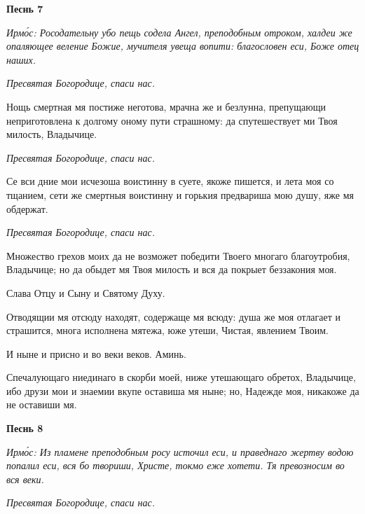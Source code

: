  

\bfseries Песнь 7\normalfont{}


 \itshape Ирмо́с:\normalfont{} Росодательну убо пещь содела Ангел, преподобным отроком, халдеи же
опаляющее веление Божие, мучителя увеща вопити: благословен еси, Боже отец
наших.



 \itshape  Пресвятая Богородице, спаси нас.
\normalfont{}


   Нощь смертная мя постиже неготова, мрачна же и безлунна, препущающи
неприготовлена к долгому оному пути страшному: да спутешествует ми Твоя
милость, Владычице.



 \itshape  Пресвятая Богородице, спаси нас.
\normalfont{}


   Се вси дние мои исчезоша воистинну в суете, якоже пишется, и лета моя
со тщанием, сети же смертныя воистинну и горькия предвариша мою душу,
яже мя обдержат.



 \itshape  Пресвятая Богородице, спаси нас.
\normalfont{}


   Множество грехов моих да не возможет победити Твоего многаго
благоутробия, Владычице; но да обыдет мя Твоя милость и вся да покрыет
беззакония моя.



   Слава Отцу и Сыну и Святому Духу.



   Отводящии мя отсюду находят, содержаще мя всюду: душа же моя
отлагает и страшится, многа исполнена мятежа, юже утеши, Чистая,
явлением Твоим.



   И ныне и присно и во веки веков. Аминь.



   Спечалующаго ниединаго в скорби моей, ниже утешающаго обретох,
Владычице, ибо друзи мои и знаемии вкупе оставиша мя ныне; но, Надежде
моя, никакоже да не оставиши мя.




 

\bfseries Песнь 8\normalfont{}


 \itshape Ирмо́с:\normalfont{} Из пламене преподобным росу источил еси, и праведнаго жертву водою
попалил еси, вся бо твориши, Христе, токмо еже хотети. Тя превозносим во вся
веки.



 \itshape  Пресвятая Богородице, спаси нас.
\normalfont{}


